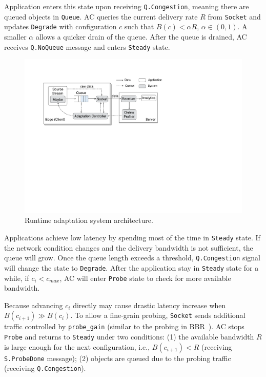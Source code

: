  Application enters this state upon
receiving \texttt{Q.Congestion}, meaning there are queued objects in
\texttt{Queue}. AC queries the current delivery rate $R$ from \texttt{Socket}
and updates \texttt{Degrade} with configuration $c$ such that $B(c) < \alpha R$,
$\alpha \in (0, 1)$. A smaller $\alpha$ allows a quicker drain of the
queue. After the queue is drained, AC receives \texttt{Q.NoQueue} message and
enters \texttt{Steady} state.

\begin{figure}
  \centering
  \includegraphics[width=\linewidth]{figures/runtime-adaptation.pdf}
  \caption{Runtime adaptation system architecture.}
  \label{fig:runtime}
\end{figure}

 Applications achieve low latency by
spending most of the time in \texttt{Steady} state. If the network condition
changes and the delivery bandwidth is not sufficient, the queue will grow. Once
the queue length exceeds a threshold, \texttt{Q.Congestion} signal will change
the state to \texttt{Degrade}. After the application stay in \texttt{Steady}
state for a while, if $c_i < c_{max}$, AC will enter \texttt{Probe} state to
check for more available bandwidth.

 Because advancing $c_i$
directly may cause drastic latency increase when $B(c_{i+1}) \gg B(c_i)$. To
allow a fine-grain probing, \texttt{Socket} sends additional traffic controlled
by \texttt{probe\_gain} (similar to the probing in BBR~\cite{cardwell2017bbr}).
AC stops \texttt{Probe} and returns to \texttt{Steady} under two conditions: (1)
the available bandwidth $R$ is large enough for the next configuration, i.e.,
$B(c_{i+1}) < R$ (receiving \texttt{S.ProbeDone} message); (2) objects are
queued due to the probing traffic (receiving \texttt{Q.Congestion}).

